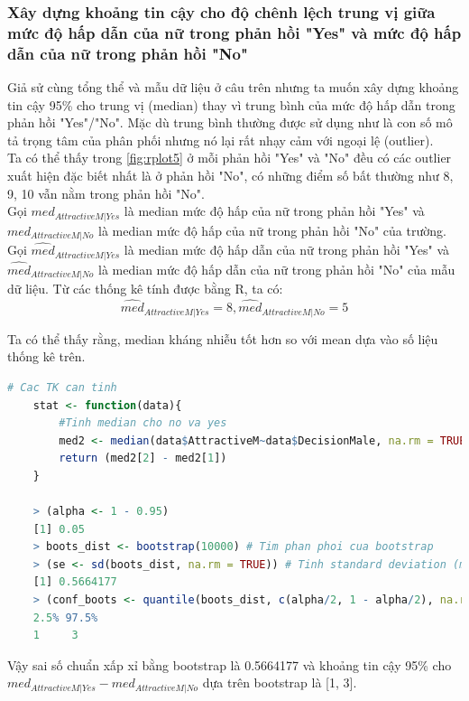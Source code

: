 \documentclass[a4paper,12pt]{article}
\begin{document}
	\subsubsection{Xây dựng khoảng tin cậy cho độ chênh lệch trung vị giữa mức độ hấp dẫn của nữ trong phản hồi "Yes" và mức độ hấp dẫn của nữ trong phản hồi "No"}
	
	Giả sử cùng tổng thể và mẫu dữ liệu ở câu trên nhưng ta muốn xây dựng khoảng tin cậy 95\% cho
	trung vị (median) thay vì trung bình của mức độ hấp dẫn trong phản hồi "Yes"/"No". Mặc dù trung bình thường được sử dụng như là con số mô tả trọng tâm của phân phối nhưng nó lại rất nhạy cảm với ngoại lệ (outlier).\\
	
	Ta có thể thấy trong \ref{fig:rplot5} ở mỗi phản hồi "Yes" và "No" đều có các outlier xuất hiện đặc biết nhất là ở phản hồi "No", có những điểm số bất thường như 8, 9, 10 vẫn nằm trong phản hồi "No".\\
	
	Gọi $med_{AttractiveM|Yes}$ là median mức độ hấp của nữ trong phản hồi "Yes" và $med_{AttractiveM|No}$ là median mức độ hấp của nữ trong phản hồi "No" của trường.\\
	
	Gọi $\hat{med}_{AttractiveM|Yes}$ là median mức độ hấp dẫn của nữ trong phản hồi "Yes" và  $\hat{med}_{AttractiveM|No}$ là median mức độ hấp dẫn của nữ trong phản hồi "No" của mẫu dữ liệu. Từ các thống kê tính được bằng R, ta có:
	$$\hat{med}_{AttractiveM|Yes} = 8, \hat{med}_{AttractiveM|No} = 5$$
	
	Ta có thể thấy rằng, median kháng nhiễu tốt hơn so với mean dựa vào số liệu thống kê trên.\\
	
	\begin{lstlisting}[language=R]
	# Cac TK can tinh
	stat <- function(data){
		#Tinh median cho no va yes
		med2 <- median(data$AttractiveM~data$DecisionMale, na.rm = TRUE)
		return (med2[2] - med2[1])
	}
	
	> (alpha <- 1 - 0.95)
	[1] 0.05
	> boots_dist <- bootstrap(10000) # Tim phan phoi cua bootstrap
	> (se <- sd(boots_dist, na.rm = TRUE)) # Tinh standard deviation (missing value se bi bo qua)
	[1] 0.5664177
	> (conf_boots <- quantile(boots_dist, c(alpha/2, 1 - alpha/2), na.rm = TRUE)) # Tim khoang tin cay cho median
	2.5% 97.5% 
	1     3 
	\end{lstlisting}
	Vậy sai số chuẩn xấp xỉ bằng bootstrap là 0.5664177 và khoảng tin cậy 95\% cho $med_{AttractiveM|Yes} - med_{AttractiveM|No}$ dựa trên bootstrap là [1, 3].\\
	
\end{document}
